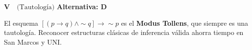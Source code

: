 \begin{tcolorbox}[
  enhanced, breakable,
  colback=GrisClaro, colframe=AzulPizarra,
  fonttitle=\bfseries\sffamily,
  title={Ejercicio 4 --- Nivel Avanzado (UNMSM)},
  arc=3pt, boxrule=0.8pt
]
\medskip
\begin{tcolorbox}[
  colback=AzulClaro!60, colframe=AzulPizarra,
  arc=2pt, boxrule=0.8pt, left=8pt, right=8pt
]
\centering
$\displaystyle \boxed{\mathbf{V} \quad \text{(Tautolog\'{i}a)}}$
\quad \textbf{Alternativa: D}
\end{tcolorbox}

\begin{cajatip}
  El esquema $[(p \rightarrow q) \wedge \sim q] \rightarrow \sim p$ es
  el \textbf{Modus Tollens}, que siempre es una tautología. Reconocer
  estructuras clásicas de inferencia válida ahorra tiempo en San Marcos
  y UNI.
\end{cajatip}
\end{tcolorbox}
\vspace{0.5cm}


